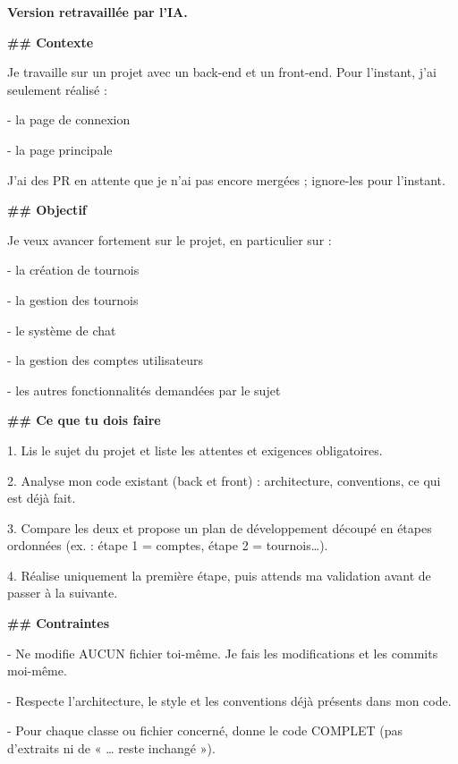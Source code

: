 \documentclass[11pt,a4paper]{article}
\begin{document}
\begin{prompt}
\textbf{Version retravaillée par l'IA.}\par\vspace{0.3em}
\setlength{\parskip}{0.15em}
\textbf{\#\# Contexte}\par
Je travaille sur un projet avec un back-end et un front-end. Pour l'instant, j'ai seulement réalisé :\par
- la page de connexion\par
- la page principale\par
\vspace{0.45em}
J'ai des PR en attente que je n'ai pas encore mergées ; ignore-les pour l'instant.\par
\vspace{0.45em}
\textbf{\#\# Objectif}\par
Je veux avancer fortement sur le projet, en particulier sur :\par
- la création de tournois\par
- la gestion des tournois\par
- le système de chat\par
- la gestion des comptes utilisateurs\par
- les autres fonctionnalités demandées par le sujet\par
\vspace{0.45em}
\textbf{\#\# Ce que tu dois faire}\par
1. Lis le sujet du projet et liste les attentes et exigences obligatoires.\par
2. Analyse mon code existant (back et front) : architecture, conventions, ce qui est déjà fait.\par
3. Compare les deux et propose un plan de développement découpé en étapes ordonnées (ex. : étape 1 = comptes, étape 2 = tournois…).\par
4. Réalise uniquement la première étape, puis attends ma validation avant de passer à la suivante.\par
\vspace{0.45em}
\textbf{\#\# Contraintes}\par
- Ne modifie AUCUN fichier toi-même. Je fais les modifications et les commits moi-même.\par
- Respecte l'architecture, le style et les conventions déjà présents dans mon code.\par
- Pour chaque classe ou fichier concerné, donne le code COMPLET (pas d'extraits ni de « … reste inchangé »).\par

\end{prompt}
\end{document}
